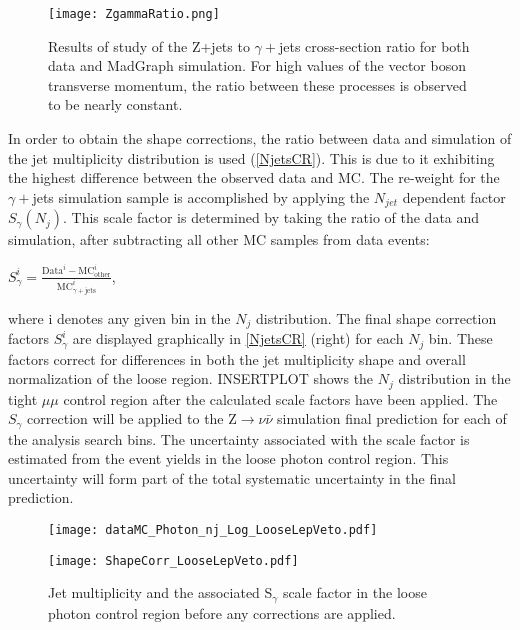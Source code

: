 \begin{figure}[H]
\begin{center}
\texttt{[image: ZgammaRatio.png]}
\end{center}
\vspace{-1em}
\caption{Results of study of the Z+jets to $\gamma+$jets cross-section ratio for both data and MadGraph simulation. For high values of the vector boson transverse momentum, the ratio between these processes is observed to be nearly constant.}
\label{Zgamma}
\end{figure}

\vspace{1em}

In order to obtain the shape corrections, the ratio between data and simulation of the jet multiplicity distribution is used (\autoref{NjetsCR}). This is due to it exhibiting the highest difference between the observed data and MC. The re-weight for the $\gamma+$jets simulation sample is accomplished by applying the $N_{jet}$ dependent factor $S_\gamma(N_j)$. This scale factor is determined by taking the ratio of the data and simulation, after subtracting all other MC samples from data events:

\begingroup
	\Large
	\begin{center}
		$S^{i}_{\gamma} = \frac{\text{Data}^{i} - \text{M}\text{C}^{i}_\text{other}}{\text{M}\text{C}_{\gamma+\text{jets}}^i}$,
	\end{center}
\endgroup

\noindent where i denotes any given bin in the $N_j$ distribution. The final shape correction factors $S^{i}_{\gamma}$ are displayed graphically in \autoref{NjetsCR} (right) for each $N_j$ bin. These factors correct for differences in both the jet multiplicity shape and overall normalization of the loose region. INSERTPLOT shows the $N_j$ distribution in the tight $\mu\mu$ control region after the calculated scale factors have been applied. The $S_{\gamma}$ correction will be applied to the Z$\rightarrow\nu\bar{\nu}$ simulation final prediction for each of the analysis search bins. The uncertainty associated with the scale factor is estimated from the event yields in the loose photon control region. This uncertainty will form part of the total systematic uncertainty in the final prediction.

\begin{figure}[H]
\begin{center}
\begin{minipage}[b]{0.45\textwidth}
\texttt{[image: dataMC\_Photon\_nj\_Log\_LooseLepVeto.pdf]}
\end{minipage}
\begin{minipage}[b]{0.5\textwidth}
    \texttt{[image: ShapeCorr\_LooseLepVeto.pdf]}
\end{minipage}
\end{center}
\vspace{-1em}
\caption{Jet multiplicity and the associated S$_\gamma$ scale factor in the loose photon control region before any corrections are applied.}
\label{NjetsCR}
\end{figure}


